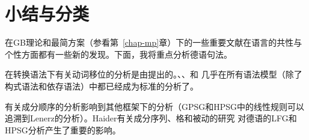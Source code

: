 \section{小结与分类}
\label{sec-summary-gb}

在GB理论和最简方案（参看第~\ref{chap-mp}章）下的一些重要文献在语言的共性与个性方面都有一些新的发现。下面，我将重点分析德语句法。

在转换语法下有关动词移位的分析是由\citet*[]{Bierwisch63}提出的。\citet{Reis74a}、\citet{Koster75a}、\citet[Chapter~1]{Thiersch78a}和 \citet{denBesten83a}几乎在所有语法模型（除了构式语法\indexcxg 和依存语法\indexdg ）中都已经成为标准的分析了。

\citet{Lenerz77}有关成分顺序的分析影响到其他框架下的分析（GPSG和HPSG中的线性规则可以追溯到Lenerz的分析）。Hai\-der有关成分序列、格和被动的研究\citeyearpar{Haider84b,Haider85,Haider85b,Haider86,Haider90a,Haider93a} 对德语的LFG和HPSG分析产生了重要的影响。

